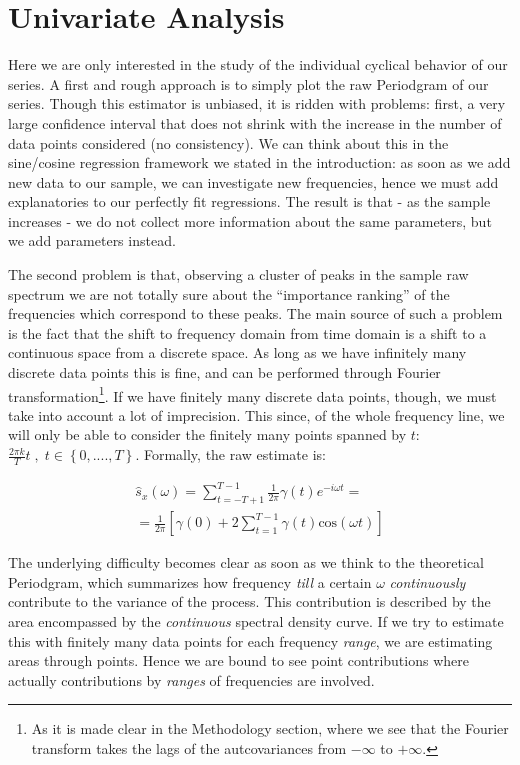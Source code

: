 \documentclass[12pt]{article} %
\begin{document}
\section{Univariate Analysis}

Here we are only interested in the study of the individual cyclical behavior of our series. A first and rough approach is to simply plot the raw Periodgram of our series. Though this estimator is unbiased, it is ridden with problems: first, a very large confidence interval that does not shrink with the increase in the number of data points considered (no consistency). We can think about this in the sine/cosine regression framework we stated in the introduction: as soon as we add new data to our sample, we can investigate new frequencies, hence we must add explanatories to our perfectly fit regressions.  The result is that - as the sample increases - we do not collect more information about the same parameters, but we add parameters instead.

The second problem is that, observing a cluster of peaks in the sample raw spectrum we are not totally sure about the ``importance ranking'' of the frequencies which correspond to these peaks. The main source of such a problem is the fact that the shift to frequency domain from time domain is a shift to a continuous space from a discrete space. As long as we have infinitely many discrete data points this is fine, and can be performed through Fourier transformation\footnote{As it is made clear in the Methodology section, where we see that the Fourier transform takes the lags of the autcovariances from $-\infty$ to $+\infty$.}. If we have finitely many discrete data points, though, we must take into account a lot of imprecision. This since, of the whole frequency line, we will only be able to consider the finitely many points spanned by $t$: $\frac{2\pi k}{T}t\;,\;t\in\left\{0,....,T\right\}$. Formally, the raw estimate is:

\begin{equation}
\begin{aligned}
\hat{s}_x(\omega)=\sum\limits_{t=-T+1}^{T-1} \frac{1}{2\pi} \gamma(t)e^{-i\omega t}=\\
=\frac{1}{2\pi}\left[\gamma(0)+2\sum\limits_{t=1}^{T-1} \gamma(t)\text{cos}(\omega t)\right]
\end{aligned}
\end{equation}

The underlying difficulty becomes clear as soon as we think to the theoretical Periodgram, which summarizes how frequency {\em till} a certain $\omega$ {\em continuously} contribute to the variance of the process. This contribution is described by the area encompassed by the {\em continuous} spectral density curve. If we try to estimate this with finitely many data points for each frequency {\em range}, we are estimating areas through points. Hence we are bound to see point contributions where actually contributions by {\em ranges} of frequencies are involved.
\end{document}
